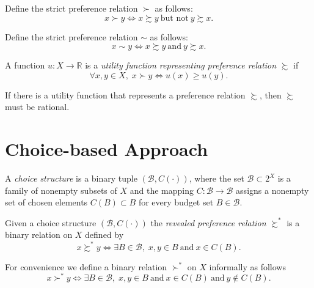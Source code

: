 \documentclass[11pt,fleqn]{book} %
\begin{document}
\begin{definition}
	Define the strict preference relation $\succ$ as follows:
	\[	
	x\succ y \Longleftrightarrow x\succsim y \ \text{but not}\  y\succsim x.
	\]
\end{definition}

\begin{definition}
	Define the strict preference relation $\sim$ as follows:
	\[	
	x\sim y \Longleftrightarrow x\succsim y \ \text{and}\  y\succsim x.
	\]
\end{definition}

\begin{definition}
    A function $u:X\rightarrow\mathbb{R}$ is a \emph{utility function representing preference relation} $\succsim$ if
    \[
    \forall x,y\in X,\;x\succ y\Longleftrightarrow u(x)\ge u(y).
    \]
\end{definition}

\begin{proposition}
	If there is a utility function that represents a preference relation $\succsim$, then $\succsim$ must be rational. 
\end{proposition}


\section{Choice-based Approach}

\begin{definition}
	A \emph{choice structure} is a binary tuple $(\mathcal{B},C(\cdot))$, where the set $\mathcal{B}\subset 2^X$ is a family of nonempty subsets of $X$ and the mapping $C:\mathcal{B}\rightarrow \mathcal{B}$ assigns a nonempty set of chosen elements $C(B)\subset B$ for every budget set $B\in\mathcal{B}$.
\end{definition}

\begin{definition}
	Given a choice structure $(\mathcal{B},C(\cdot))$ the \emph{revealed preference relation} $\succsim^*$ is a binary relation on $X$ defined by
	\[
	x\succsim^*y\Longleftrightarrow \exists B\in\mathcal{B},\;x,y\in B \ \text{and}\  x\in C(B).
	\]
\end{definition}

\begin{remark}
	For convenience we define a binary relation $\succ^*$ on $X$ informally as follows 
	\[
	x\succ^*y\Longleftrightarrow \exists B\in\mathcal{B},\;x,y\in B \ \text{and}\  x\in C(B) \ \text{and}\ y\notin C(B).
	\]
\end{remark}
\end{document}
